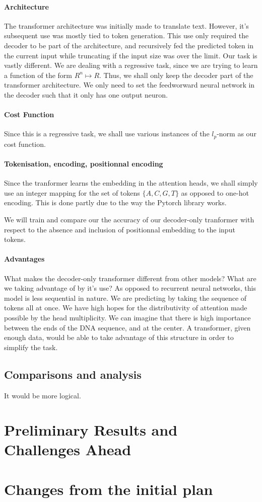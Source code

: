 \documentclass{article}
\begin{document}
\paragraph{Architecture}
The transformer architecture was initially made to translate text.
However, it's subsequent use was mostly tied to token generation. 
This use only required the decoder to be part of the architecture, 
and recursively fed the predicted token in the current input while 
truncating if the input size was over the limit.
Our task is vastly different. We are dealing with a regressive task,
since we are trying to learn a function of the form $R^n \mapsto R$.
Thus, we shall only keep the decoder part of the transformer architecture. 
We only need to set the feedworward neural network in the decoder such that 
it only has one output neuron.
\paragraph{Cost Function}
Since this is a regressive task, we shall use various instances of the 
$l_p$-norm as our cost function.

\paragraph{Tokenisation, encoding, positionnal encoding}
Since the tranformer learns the embedding in the attention heads, \cite{transformers} we
shall simply use an integer mapping for the set of tokens $\{A,C,G,T\}$ as opposed to 
one-hot encoding. This is done partly due to the way the Pytorch library works.

We will train and compare our the accuracy of our decoder-only tranformer with 
respect to the absence and inclusion of positionnal embedding to the input tokens.


\paragraph{Advantages}
What makes the decoder-only transformer different from other models? What are
we taking advantage of by it's use? As opposed to recurrent neural networks, 
this model is less sequential in nature. We are predicting by 
taking the sequence of tokens all at once. We have high hopes for the 
distributivity of attention made possible by the head multiplicity.
We can imagine that there is high importance between the ends of the DNA 
sequence, and at the center. A transformer, given enough data, would 
be able to take advantage of this structure in order to simplify the task.


\subsection{Comparisons and analysis}
It would be more logical.

\section{Preliminary Results and Challenges Ahead}

\section{Changes from the initial plan}



\end{document}
